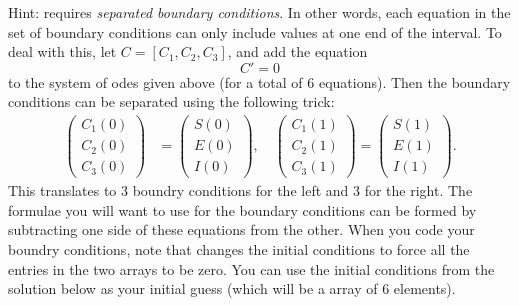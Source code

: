 \begin{problem}
Hint:  requires \emph{separated boundary conditions}.
In other words, each equation in the set of boundary conditions can only include values at one end of the interval.
To deal with this, let $C = [C_1, C_2, C_3]$, and add the equation
\[C' = 0\]
to the system of odes given above (for a total of 6 equations).
Then the boundary conditions can be separated using the following trick:
\begin{align*}
	\begin{pmatrix}C_1(0) \\C_2(0) \\ C_3(0) \end{pmatrix} &= \begin{pmatrix}S(0) \\E(0) \\ I(0) \end{pmatrix}, \quad 	\begin{pmatrix}C_1(1) \\C_2(1) \\ C_3(1) \end{pmatrix} = \begin{pmatrix}S(1) \\E(1) \\ I(1) \end{pmatrix}.
\end{align*}
This translates to 3 boundry conditions for the left and 3 for the right.
The formulae you will want to use for the boundary conditions can be formed by subtracting one side of these equations from the other.
When you code your boundry conditions, note that  changes the initial conditions to force all the entries in the two arrays to be zero.
You can use the initial conditions from the solution below as your initial guess (which will be a array of 6 elements).

\label{prob:sir_measles}
\end{problem}